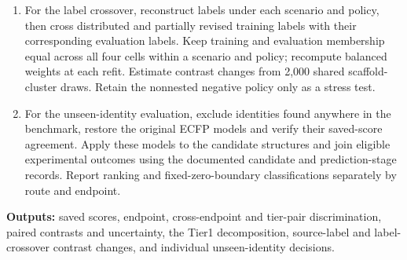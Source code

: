 \begin{enumerate}
\item For the label crossover, reconstruct labels under each scenario and policy, then cross distributed and partially revised training labels with their corresponding evaluation labels. Keep training and evaluation membership equal across all four cells within a scenario and policy; recompute balanced weights at each refit. Estimate contrast changes from 2,000 shared scaffold-cluster draws. Retain the nonnested negative policy only as a stress test.
\item For the unseen-identity evaluation, exclude identities found anywhere in the benchmark, restore the original ECFP models and verify their saved-score agreement. Apply these models to the candidate structures and join eligible experimental outcomes using the documented candidate and prediction-stage records. Report ranking and fixed-zero-boundary classifications separately by route and endpoint.
\end{enumerate}
\textbf{Outputs:} saved scores, endpoint, cross-endpoint and tier-pair discrimination, paired contrasts and uncertainty, the Tier1 decomposition, source-label and label-crossover contrast changes, and individual unseen-identity decisions.
